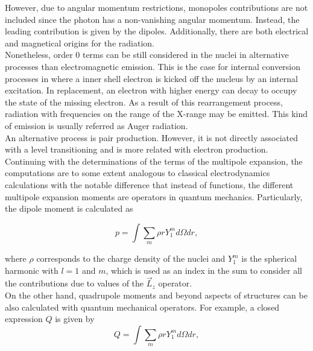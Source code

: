 \documentclass[openany]{book}
\begin{document}
However, due to angular momentum restrictions, monopoles contributions are not included since the photon has a non-vanishing angular momentum. Instead, the leading contribution is given by the dipoles. Additionally, there are both electrical and magnetical origins for the radiation.  \\

Nonetheless, order 0 terms can be still considered in the nuclei in alternative processes than electromagnetic emission. This is the case for internal conversion processes in where a inner shell electron is kicked off the nucleus by an internal excitation. In replacement, an electron with higher energy can decay to occupy the state of the missing electron. As a result of this rearrangement process, radiation with frequencies on the range of the X-range may be emitted. This kind of emission is usually referred as Auger radiation. \\

An alternative process is pair production. However, it is not directly associated with a level transitioning and is more related with electron production.  \\

Continuing with the determinations of the terms of the multipole expansion, the computations are to some extent analogous to classical electrodynamics calculations with the notable difference that instead of functions, the different multipole expansion moments are operators in quantum mechanics. Particularly, the dipole moment is calculated as

\begin{equation}\label{eq:nuclearTransitions_dipole}
	p = \int  \sum_m {\rho r Y^{m}_1 } d\Omega dr, 
\end{equation}

where $\rho$ corresponds to the charge density of the nuclei and $Y^{m}_1$ is the spherical harmonic with $l =1$ and $m$, which is used as an index in the sum to consider all the contributions due to values of the $\vec L_z$ operator. \\

On the other hand, quadrupole moments and beyond aspects of structures can be also calculated with quantum mechanical operators. For example, a closed expression $Q$ is given by \\

\begin{equation}\label{eq:nuclearTransitions_quadrupole}
	Q = \int  \sum_m {\rho r Y^{m}_1 } d\Omega dr, 
\end{equation}
\end{document}
